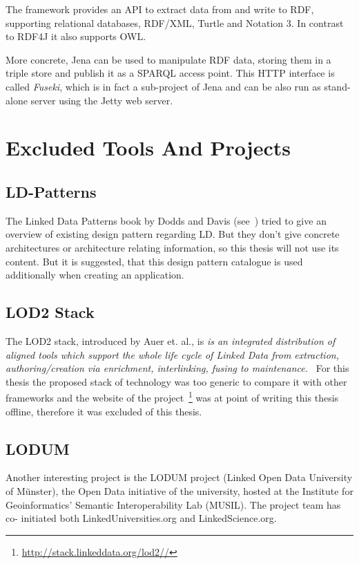 The framework provides an API to extract data from and write to RDF, supporting 
relational databases, RDF/XML, Turtle and Notation 3. In contrast to RDF4J it also 
supports OWL.

More concrete, Jena can be used to manipulate RDF data, storing them in a triple 
store and publish it as a SPARQL access point. This HTTP interface is called 
\emph{Fuseki}, which is in fact a sub-project of Jena and can be also run as 
stand-alone server using the Jetty web server.

\newpage
\section{Excluded Tools And Projects}\label{excluded}

\subsection{LD-Patterns}
The Linked Data Patterns book by Dodds and Davis (see~\cite{dodds2011linked}) 
tried to give an overview of existing design pattern regarding LD. But they don't 
give concrete architectures or architecture relating information, so this thesis 
will not use its content. But it is suggested, that this design pattern catalogue 
is used additionally when creating an application.

\subsection{LOD2 Stack}

The LOD2 stack, introduced by Auer et. al., is \emph{is an integrated distribution 
of aligned tools which support the whole life cycle of Linked Data from 
extraction, authoring/creation via enrichment, interlinking, fusing to 
maintenance.}~\cite{auer2012managing} For this thesis the proposed stack of 
technology was too generic to compare it with other frameworks and the website of 
the project~\footnote{\url{http://stack.linkeddata.org/lod2//}} was at point of 
writing this thesis offline, therefore it was excluded of this thesis.

\subsection{LODUM}

Another interesting project is the LODUM project (Linked Open Data University of 
Münster), the Open Data initiative of the university, hosted at the Institute for 
Geoinformatics' Semantic Interoperability Lab (MUSIL). The project team has co-
initiated both LinkedUniversities.org and LinkedScience.org.

